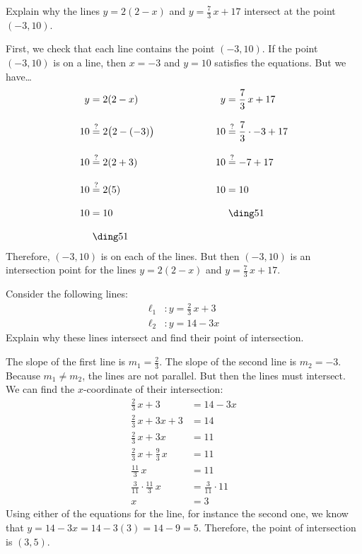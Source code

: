 \documentclass[11pt,letterpaper]{article}
\begin{document}

 Explain why the lines $y= 2(2 - x)$ and $y= \frac{7}{3}\,x + 17$ intersect at the point $(-3, 10)$. \pspace

\sol First, we check that each line contains the point $(-3, 10)$. If the point $(-3, 10)$ is on a line, then $x= -3$ and $y= 10$ satisfies the equations. But we have\dots
	\[
	\begin{aligned}
	y&= 2(2 - x) &\hspace{2cm} y&= \frac{7}{3}\,x + 17 \\[0.3cm]
	10&\stackrel{?}{=} 2 \big(2 - (-3) \big) & 10&\stackrel{?}{=} \frac{7}{3} \cdot -3 + 17 \\[0.3cm]
	10&\stackrel{?}{=} 2 (2 + 3) & 10&\stackrel{?}{=} - 7 + 17 \\[0.3cm]
	10&\stackrel{?}{=} 2(5) & 10&= 10 \\[0.3cm]
	10&= 10 & &\;\text{\cmark} \\[0.3cm]
	&\;\text{\cmark}
	\end{aligned}
	\]
Therefore, $(-3, 10)$ is on each of the lines. But then $(-3, 10)$ is an intersection point for the lines $y= 2(2 - x)$ and $y= \frac{7}{3}\,x + 17$. 



\newpage



 Consider the following lines:
	\[
	\begin{aligned}
	\ell_1&: y= \frac{2}{3}\,x + 3 \\[0.3cm]
	\ell_2&: y= 14 - 3x
	\end{aligned}
	\]
Explain why these lines intersect and find their point of intersection. \pspace

\sol The slope of the first line is $m_1= \frac{2}{3}$. The slope of the second line is $m_2= -3$. Because $m_1 \neq m_2$, the lines are not parallel. But then the lines must intersect. We can find the $x$-coordinate of their intersection:
	\[
	\begin{aligned}
	\frac{2}{3}\,x + 3&= 14 - 3x \\[0.3cm]
	\frac{2}{3}\,x + 3x + 3&= 14 \\[0.3cm]
	\frac{2}{3}\,x + 3x&= 11 \\[0.3cm]
	\frac{2}{3}\,x + \frac{9}{3}\,x&= 11 \\[0.3cm]
	\frac{11}{3}\,x&= 11 \\[0.3cm]
	\frac{3}{11} \cdot \frac{11}{3}\,x&= \frac{3}{11} \cdot 11 \\[0.3cm]
	x&= 3
	\end{aligned}
	\]
Using either of the equations for the line, for instance the second one, we know that $y= 14 - 3x= 14 - 3(3)= 14 - 9= 5$. Therefore, the point of intersection is $(3, 5)$. 
\end{document}
